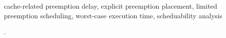\label{sec:keywords}
\begin{IEEEkeywords} 
cache-related preemption delay, explicit preemption placement, limited preemption scheduling, worst-case execution time, scheduability analysis
\end{IEEEkeywords}.

